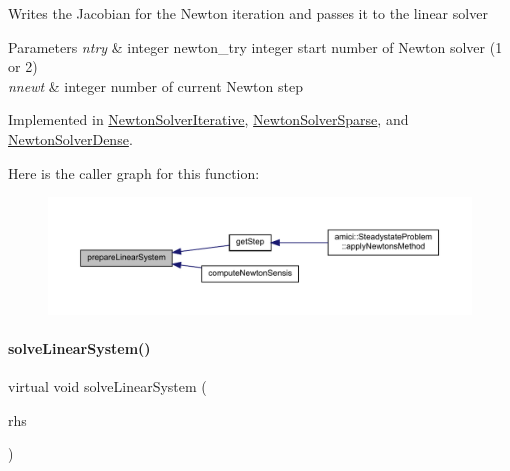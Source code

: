 Writes the Jacobian for the Newton iteration and passes it to the linear solver


\begin{DoxyParams}{Parameters}
{\em ntry} & integer newton\+\_\+try integer start number of Newton solver (1 or 2) \\
\hline
{\em nnewt} & integer number of current Newton step \\
\hline
\end{DoxyParams}


Implemented in \mbox{\hyperlink{classamici_1_1_newton_solver_iterative_acb5ad8b8b0ff7ee8d963194ca8c8ed78}{Newton\+Solver\+Iterative}}, \mbox{\hyperlink{classamici_1_1_newton_solver_sparse_a0b900656d018299b08d0f027e95bd347}{Newton\+Solver\+Sparse}}, and \mbox{\hyperlink{classamici_1_1_newton_solver_dense_a0b900656d018299b08d0f027e95bd347}{Newton\+Solver\+Dense}}.

Here is the caller graph for this function\+:
\nopagebreak
\begin{figure}[H]
\begin{center}
\leavevmode
\includegraphics[width=350pt]{classamici_1_1_newton_solver_a4aed46b0343374f171f9b4b51fa009e7_icgraph}
\end{center}
\end{figure}
\mbox{\label{classamici_1_1_newton_solver_a761a5dc9e8cc7adfd4a392421df17c3d}} 
\paragraph{\texorpdfstring{solve\+Linear\+System()}{solveLinearSystem()}}
{\footnotesize\ttfamily virtual void solve\+Linear\+System (\begin{DoxyParamCaption}\item[{\mbox{\hyperlink{classamici_1_1_ami_vector}{Ami\+Vector}} $\ast$}]{rhs }\end{DoxyParamCaption})\hspace{0.3cm}{\ttfamily [pure virtual]}}

